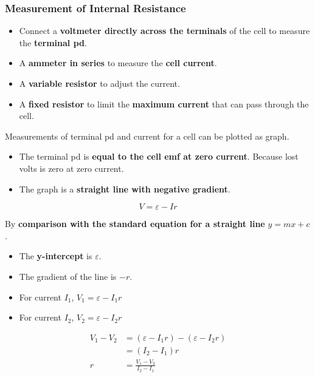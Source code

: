 \subsubsection*{Measurement of Internal Resistance}

\begin{itemize}
    \item Connect a \textbf{voltmeter directly across the terminals} of the cell to measure the \textbf{terminal pd}.
    \item A \textbf{ammeter in series} to measure the \textbf{cell current}.
    \item A \textbf{variable resistor} to adjust the current.
    \item A \textbf{fixed resistor} to limit the \textbf{maximum current} that can pass through the cell.
\end{itemize}

Measurements of terminal pd and current for a cell can be plotted as graph.
\begin{itemize}
    \item The terminal pd is \textbf{equal to the cell emf at zero current}. Because lost volts is zero at zero current.
    \item The graph is a \textbf{straight line with negative gradient}.
\end{itemize}
$$V=\varepsilon-Ir$$

By \textbf{comparison with the standard equation for a straight line} $y=mx+c$.
\begin{itemize}
    \item The \textbf{y-intercept} is $\varepsilon$.
    \item The gradient of the line is $-r$.
\end{itemize}

\begin{itemize}
    \item For current $I_1$, $V_1=\varepsilon-I_1r$
    \item For current $I_2$, $V_2=\varepsilon-I_2r$
\end{itemize}

\begin{align*}
    V_1-V_2&=(\varepsilon-I_1r)-(\varepsilon-I_2r)\\
           &=(I_2-I_1)r\\
    r&=\frac{V_1-V_2}{I_2-I_1}
\end{align*}
